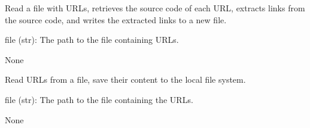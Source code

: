 \documentclass[letterpaper,10pt,english]{sphinxmanual}
\begin{document}

\begin{fulllineitems}
\label{\detokenize{Project.Script:Project.Script.RecupKbZscaler.getAllPagesUrls}}
\pysigstartsignatures
{}
\pysigstopsignatures
\sphinxAtStartPar
Read a file with URLs, retrieves the source code of each URL, extracts links from the source code, and writes the extracted links to a new file.
\begin{description}
\sphinxAtStartPar
file (str): The path to the file containing URLs.

\sphinxAtStartPar
None

\end{description}

\end{fulllineitems}


\begin{fulllineitems}
\label{\detokenize{Project.Script:Project.Script.RecupKbZscaler.getContent}}
\pysigstartsignatures
{}
\pysigstopsignatures
\sphinxAtStartPar
Read URLs from a file, save their content to the local file system.
\begin{description}
\sphinxAtStartPar
file (str): The path to the file containing the URLs.

\sphinxAtStartPar
None

\end{description}

\end{fulllineitems}

\end{document}
